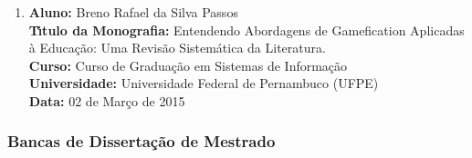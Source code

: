 \documentclass[a4paper,oneside,10pt]{article}
\begin{document}
\begin{enumerate}
\item       \textbf{Aluno:} Breno Rafael da Silva Passos \mbox{}\\
            \textbf{T\'{\i}tulo da Monografia:} Entendendo Abordagens de Gamefication Aplicadas à Educação: Uma Revisão Sistemática da Literatura.\\
            \textbf{Curso:} Curso de Gradua\c{c}\~{a}o em Sistemas de Informa\c{c}\~{a}o\\
            \textbf{Universidade:} Universidade Federal de Pernambuco (UFPE)\\
            \textbf{Data:} 02 de Março de 2015

\end{enumerate}


\subsubsection{Bancas de Disserta\c{c}\~{a}o de Mestrado}
\vspace{0.3cm}
\end{document}
